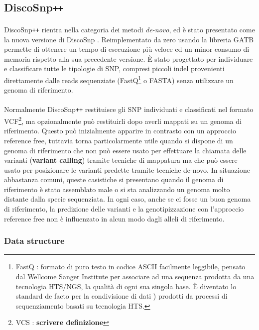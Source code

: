 \documentclass[../main.tex]{subfiles}
\begin{document}
\subsection{DiscoSnp\texttt{++}}
\paragraph{}
DiscoSnp\texttt{++} \cite{peterlongo2017discosnp++} rientra nella categoria dei metodi \textit{de-novo}, ed è stato presentato come la nuova versione di DiscoSnp \cite{uricaru2015reference}. Reimplementato da zero usando la libreria GATB \cite{drezen2014gatb} permette di ottenere un tempo di esecuzione più veloce ed un minor consumo di memoria rispetto alla sua precedente versione. È stato progettato per individuare e classificare tutte le tipologie di SNP, compresi piccoli indel provenienti direttamente dalle reads sequenziate (FastQ\footnote{FastQ :  formato di puro testo in codice ASCII facilmente leggibile, pensato dal Wellcome Sanger Institute per associare ad una sequenza prodotta da una tecnologia HTS/NGS, la qualità di ogni sua singola base. È diventato lo standard de facto per la condivisione di dati \cite{cock2010sanger}) prodotti da processi di sequenziamento basati su tecnologia HTS. } o FASTA) senza utilizzare un genoma di riferimento.

\paragraph{}  Normalmente DiscoSnp\texttt{++} restituisce gli SNP individuati e classificati nel formato VCF\footnote{VCS : \textbf{scrivere definizione}}, ma opzionalmente può restituirli dopo averli mappati su un genoma di riferimento. Questo può inizialmente apparire in contrasto con un approccio reference free, tuttavia torna particolarmente utile quando si dispone di un genoma di riferimento che non può essere usato per effettuare la chiamata delle varianti (\textbf{variant calling}) tramite tecniche di mappatura ma che può essere usato per posizionare le varianti predette tramite tecniche de-novo. In situazione abbastanza comuni, queste casistiche si presentano quando il genoma di riferimento è stato assemblato male o si sta analizzando un genoma molto distante dalla specie sequenziata. In ogni caso, anche se ci fosse un buon genoma di riferimento, la predizione delle varianti e la genotipizzazione con l'approccio reference free non è influenzato in alcun modo dagli alleli di riferimento.

\subsubsection{Data structure}
\end{document}
